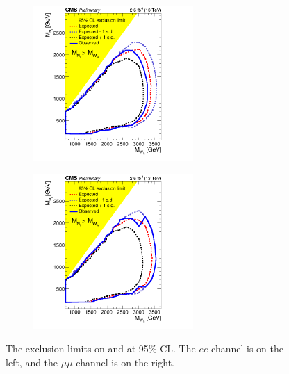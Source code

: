 \begin{figure}
	\centering
	\begin{subfigure}[t]{2.4in}
		\centering
		\includegraphics[width=2.4in]{figures/lim2dWReejj_SHv19700toysAprilTwentyThree_exclusionOverlayWithExpPlusMinusOneSigma.png}
	\end{subfigure}
	\thickspace
	\begin{subfigure}[t]{2.4in}
		\centering
		\includegraphics[width=2.4in]{figures/lim2dWRmumujj_SHv19700toysAprilTwentyThree_exclusionOverlayWithExpPlusMinusOneSigma.png}
	\end{subfigure}
	\caption{The exclusion limits on \mWR and \mnul at 95\% CL.  The $ee$-channel is on the left, and the $\mu\mu$-channel is on 
	the right.}
	\label{fig:twoDimLimits}
\end{figure}

